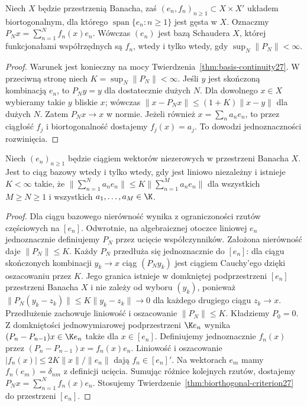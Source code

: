 \begin{twierdzenie}
\label{thm:biorthogonal-criterion27}
Niech $X$ będzie przestrzenią Banacha, zaś
$(e_n,f_n)_{n\ge1}\subset X\times X'$ układem biortogonalnym,
dla którego $\operatorname{span}\{e_n:n\ge1\}$ jest gęsta w $X$.
Oznaczmy $P_Nx=\sum_{n=1}^Nf_n(x)e_n$.
Wówczas $(e_n)$ jest bazą Schaudera $X$, której
funkcjonałami współrzędnych są $f_n$, wtedy i tylko wtedy,
gdy $\sup_N\|P_N\|<\infty$.
\end{twierdzenie}
\begin{proof}
Warunek jest konieczny na mocy
Twierdzenia~\ref{thm:basis-continuity27}.
W przeciwną stronę niech $K=\sup_N\|P_N\|<\infty$.
Jeśli $y$ jest skończoną kombinacją $e_n$, to $P_Ny=y$
dla dostatecznie dużych $N$. Dla dowolnego $x\in X$
wybieramy takie $y$ bliskie $x$; wówczas
$\|x-P_Nx\|\le(1+K)\|x-y\|$ dla dużych $N$.
Zatem $P_Nx\to x$ w normie.
Jeżeli również $x=\sum_na_ne_n$, to przez ciągłość $f_j$
i biortogonalność dostajemy $f_j(x)=a_j$.
To dowodzi jednoznaczności rozwinięcia.
\end{proof}

\begin{wniosek}
\label{cor:basic-sequence27}
Niech $(e_n)_{n\ge1}$ będzie ciągiem wektorów niezerowych
w przestrzeni Banacha $X$. Jest to ciąg bazowy wtedy i tylko wtedy,
gdy jest liniowo niezależny i istnieje $K<\infty$ takie, że
$\|\sum_{n=1}^Na_ne_n\|
\le K\|\sum_{n=1}^Ma_ne_n\|$
dla wszystkich $M\ge N\ge1$ i wszystkich $a_1,\ldots,a_M\in\K$.
\end{wniosek}
\begin{proof}
Dla ciągu bazowego nierówność wynika z ograniczoności
rzutów częściowych na $[e_n]$.
Odwrotnie, na algebraicznej otoczce liniowej $e_n$
jednoznacznie definiujemy $P_N$ przez ucięcie współczynników.
Założona nierówność daje $\|P_N\|\le K$.
Każdy $P_N$ przedłuża się jednoznacznie do $[e_n]$:
dla ciągu skończonych kombinacji $y_k\to x$ ciąg $(P_Ny_k)$
jest ciągiem Cauchy'ego dzięki oszacowaniu przez $K$.
Jego granica istnieje w domkniętej podprzestrzeni $[e_n]$
przestrzeni Banacha $X$ i nie zależy od wyboru $(y_k)$,
ponieważ $\|P_N(y_k-z_k)\|\le K\|y_k-z_k\|\to0$
dla każdego drugiego ciągu $z_k\to x$.
Przedłużenie zachowuje liniowość i oszacowanie $\|P_N\|\le K$.
Kładziemy $P_0=0$.
Z domkniętości jednowymiarowej podprzestrzeni $\K e_n$
wynika $(P_n-P_{n-1})x\in\K e_n$ także dla $x\in[e_n]$.
Definiujemy jednoznacznie $f_n(x)$ przez
$(P_n-P_{n-1})x=f_n(x)e_n$.
Liniowość i oszacowanie $|f_n(x)|\le2K\|x\|/\|e_n\|$
dają $f_n\in[e_n]'$. Na wektorach $e_m$ mamy
$f_n(e_m)=\delta_{nm}$ z definicji ucięcia.
Sumując różnice kolejnych rzutów, dostajemy
$P_Nx=\sum_{n=1}^Nf_n(x)e_n$.
Stosujemy Twierdzenie~\ref{thm:biorthogonal-criterion27}
do przestrzeni $[e_n]$.
\end{proof}

